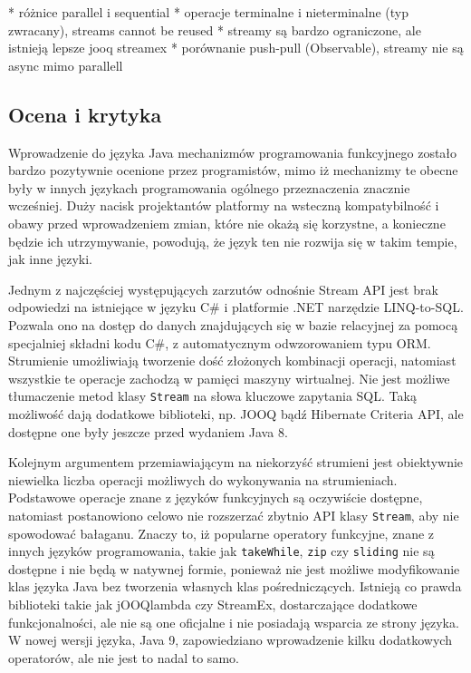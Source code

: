 \documentclass[12pt]{extarticle}
\begin{document}
* różnice parallel i sequential
* operacje terminalne i nieterminalne (typ zwracany), streams cannot be reused
* streamy są bardzo ograniczone, ale istnieją lepsze jooq streamex
* porównanie push-pull (Observable), streamy nie są async mimo parallell

\subsection{Ocena i krytyka}

    Wprowadzenie do języka Java mechanizmów programowania funkcyjnego zostało bardzo pozytywnie ocenione przez programistów, mimo iż mechanizmy te obecne były w innych językach programowania ogólnego przeznaczenia znacznie wcześniej. Duży nacisk projektantów platformy na wsteczną kompatybilność i obawy przed wprowadzeniem zmian, które nie okażą się korzystne, a konieczne będzie ich utrzymywanie, powodują, że język ten nie rozwija się w takim tempie, jak inne języki. 

    Jednym z najczęściej występujących zarzutów odnośnie Stream API jest brak odpowiedzi na istniejące w języku C\# i platformie .NET narzędzie LINQ-to-SQL. Pozwala ono na dostęp do danych znajdujących się w bazie relacyjnej za pomocą specjalniej składni kodu C\#, z automatycznym odwzorowaniem typu ORM. Strumienie umożliwiają tworzenie dość złożonych kombinacji operacji, natomiast wszystkie te operacje zachodzą w pamięci maszyny wirtualnej. Nie jest możliwe tłumaczenie metod klasy \texttt{Stream} na słowa kluczowe zapytania SQL. Taką możliwość dają dodatkowe biblioteki, np. JOOQ bądź Hibernate Criteria API, ale dostępne one były jeszcze przed wydaniem Java 8. 

    Kolejnym argumentem przemiawiającym na niekorzyść strumieni jest obiektywnie niewielka liczba operacji możliwych do wykonywania na strumieniach. Podstawowe operacje znane z języków funkcyjnych są oczywiście dostępne, natomiast postanowiono celowo nie rozszerzać zbytnio API klasy \texttt{Stream}, aby nie spowodować bałaganu. Znaczy to, iż popularne operatory funkcyjne, znane z innych języków programowania, takie jak \texttt{takeWhile}, \texttt{zip} czy \texttt{sliding} nie są dostępne i nie będą w natywnej formie, ponieważ nie jest możliwe modyfikowanie klas języka Java bez tworzenia własnych klas pośredniczących. Istnieją co prawda biblioteki takie jak jOOQlambda czy StreamEx, dostarczające dodatkowe funkcjonalności, ale nie są one oficjalne i nie posiadają wsparcia ze strony języka. W nowej wersji języka, Java 9, zapowiedziano wprowadzenie kilku dodatkowych operatorów, ale nie jest to nadal to samo.
\end{document}

